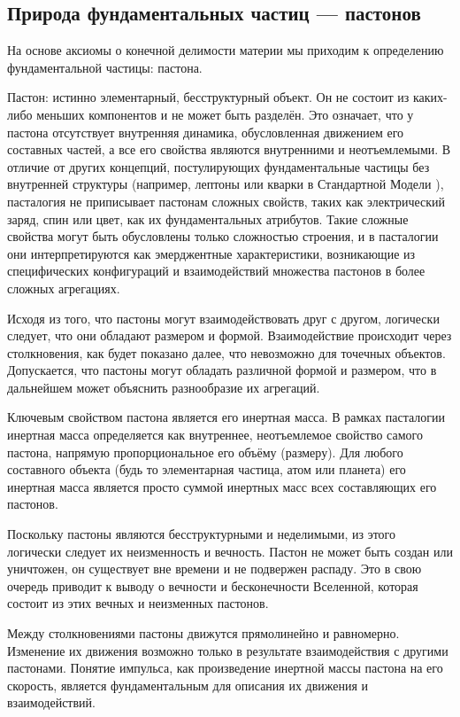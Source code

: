 \documentclass[pdflatex,sn-mathphys-num,referee]{sn-jnl}
\begin{document}
\subsection{Природа фундаментальных частиц --- пастонов}\label{subsec:pastons}

На основе аксиомы о конечной делимости материи мы приходим к определению фундаментальной частицы: пастона.

Пастон: истинно элементарный, бесструктурный объект. Он не состоит из каких-либо меньших компонентов и не может быть разделён. Это означает, что у пастона отсутствует внутренняя динамика, обусловленная движением его составных частей, а все его свойства являются внутренними и неотъемлемыми. В отличие от других концепций, постулирующих фундаментальные частицы без внутренней структуры (например, лептоны или кварки в Стандартной Модели \cite{pdg2024}), пасталогия не приписывает пастонам сложных свойств, таких как электрический заряд, спин или цвет, как их фундаментальных атрибутов. Такие сложные свойства могут быть обусловлены только сложностью строения, и в пасталогии они интерпретируются как эмерджентные характеристики, возникающие из специфических конфигураций и взаимодействий множества пастонов в более сложных агрегациях.

Исходя из того, что пастоны могут взаимодействовать друг с другом, логически следует, что они обладают размером и формой. Взаимодействие происходит через столкновения, как будет показано далее, что невозможно для точечных объектов. Допускается, что пастоны могут обладать различной формой и размером, что в дальнейшем может объяснить разнообразие их агрегаций.

Ключевым свойством пастона является его инертная масса. В рамках пасталогии инертная масса определяется как внутреннее, неотъемлемое свойство самого пастона, напрямую пропорциональное его объёму (размеру). Для любого составного объекта (будь то элементарная частица, атом или планета) его инертная масса является просто суммой инертных масс всех составляющих его пастонов.

Поскольку пастоны являются бесструктурными и неделимыми, из этого логически следует их неизменность и вечность. Пастон не может быть создан или уничтожен, он существует вне времени и не подвержен распаду. Это в свою очередь приводит к выводу о вечности и бесконечности Вселенной, которая состоит из этих вечных и неизменных пастонов.

Между столкновениями пастоны движутся прямолинейно и равномерно. Изменение их движения возможно только в результате взаимодействия с другими пастонами. Понятие импульса, как произведение инертной массы пастона на его скорость, является фундаментальным для описания их движения и взаимодействий.
\end{document}
